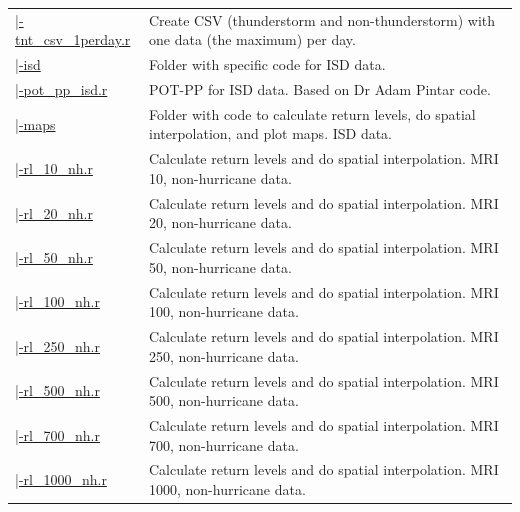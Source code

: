 \documentclass[12pt,oneside]{reedthesis}
\begin{document}
\begin{longtable}[t]{>{\raggedright\arraybackslash}p{1.3in}>{\raggedright\arraybackslash}p{4.9in}}
\href{ftp://ftp.geocorp.co/windthesis/code/pot_pp/write_t_nt_csv_one_data_per_day.r}{\;\;\;\;|-tnt\_csv\_1perday.r} & Create CSV (thunderstorm and non-thunderstorm) with one data (the maximum) per day.\\
\href{ftp://ftp.geocorp.co/windthesis/code/pot_pp/isd/}{\;\;\;\;|-isd} & Folder with specific code for ISD data.\\
\href{ftp://ftp.geocorp.co/windthesis/code/pot_pp/isd/pot_pp_isd.r}{\;\;\;\;\;\;|-pot\_pp\_isd.r} & POT-PP for ISD data. Based on Dr Adam Pintar code.\\
\href{ftp://ftp.geocorp.co/windthesis/code/pot_pp/isd/maps/}{\;\;\;\;\;\;|-maps} & Folder with code to calculate return levels, do spatial interpolation, and plot maps. ISD data.\\
\href{ftp://ftp.geocorp.co/windthesis/code/pot_pp/isd/maps/return_levels_10_nh.r}{\;\;\;\;\;\;\;\;|-rl\_10\_nh.r} & Calculate return levels and do spatial interpolation. MRI 10, non-hurricane data.\\
\href{ftp://ftp.geocorp.co/windthesis/code/pot_pp/isd/maps/return_levels_20_nh.r}{\;\;\;\;\;\;\;\;|-rl\_20\_nh.r} & Calculate return levels and do spatial interpolation. MRI 20, non-hurricane data.\\
\href{ftp://ftp.geocorp.co/windthesis/code/pot_pp/isd/maps/return_levels_50_nh.r}{\;\;\;\;\;\;\;\;|-rl\_50\_nh.r} & Calculate return levels and do spatial interpolation. MRI 50, non-hurricane data.\\
\href{ftp://ftp.geocorp.co/windthesis/code/pot_pp/isd/maps/return_levels_100_nh.r}{\;\;\;\;\;\;\;\;|-rl\_100\_nh.r} & Calculate return levels and do spatial interpolation. MRI 100, non-hurricane data.\\
\href{ftp://ftp.geocorp.co/windthesis/code/pot_pp/isd/maps/return_levels_250_nh.r}{\;\;\;\;\;\;\;\;|-rl\_250\_nh.r} & Calculate return levels and do spatial interpolation. MRI 250, non-hurricane data.\\
\href{ftp://ftp.geocorp.co/windthesis/code/pot_pp/isd/maps/return_levels_500_nh.r}{\;\;\;\;\;\;\;\;|-rl\_500\_nh.r} & Calculate return levels and do spatial interpolation. MRI 500, non-hurricane data.\\
\href{ftp://ftp.geocorp.co/windthesis/code/pot_pp/isd/maps/return_levels_700_nh.r}{\;\;\;\;\;\;\;\;|-rl\_700\_nh.r} & Calculate return levels and do spatial interpolation. MRI 700, non-hurricane data.\\
\href{ftp://ftp.geocorp.co/windthesis/code/pot_pp/isd/maps/return_levels_1000_nh.r}{\;\;\;\;\;\;\;\;|-rl\_1000\_nh.r} & Calculate return levels and do spatial interpolation. MRI 1000, non-hurricane data.\\

\end{longtable}
\end{document}
